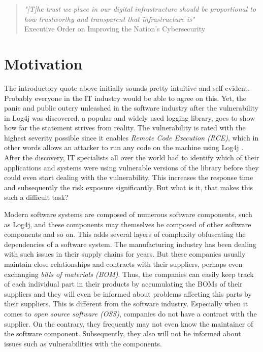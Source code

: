 
\pagestyle{fancy-style}

\begin{quote}
	\emph{"[T]he trust we place in our digital infrastructure should be proportional to how trustworthy and transparent that infrastructure is"}\\
	Executive Order on Improving the Nation's Cybersecurity \cite{ExecutiveOrderSBOM}
\end{quote}

\section{Motivation}
The introductory quote above initially sounds pretty intuitive and self evident. Probably everyone in the IT industry would be able to agree on this. Yet, the panic and public outcry unleashed in the software industry after the vulnerability in Log4j was discovered, a popular and widely used logging library, goes to show how far the statement strives from reality. The vulnerability is rated with the highest severity possible since it enables \textit{Remote Code Execution (RCE)}, which in other words allows an attacker to run any code on the machine using Log4j \cite{Log4jVuln}. After the discovery, IT specialists all over the world had to identify which of their applications and systems were using vulnerable versions of the library before they could even start dealing with the vulnerability. This increases the response time and subsequently the risk exposure significantly. But what is it, that makes this such a difficult task?\par
Modern software systems are composed of numerous software components, such as Log4j, and these components may themselves be composed of other software components and so on. This adds several layers of complexity obfuscating the dependencies of a software system. The manufacturing industry has been dealing with such issues in their supply chains for years. But these companies usually maintain close relationships and contracts with their suppliers, perhaps even exchanging \textit{bills of materials (BOM)}. Thus, the companies can easily keep track of each individual part in their products by accumulating the BOMs of their suppliers and they will even be informed about problems affecting this parts by their suppliers. This is different from the software industry. Especially when it comes to \textit{open source software (OSS)}, companies do not have a contract with the supplier. On the contrary, they frequently may not even know the maintainer of the software component. Subsequently, they also will not be informed about issues such as vulnerabilities with the components.\par
